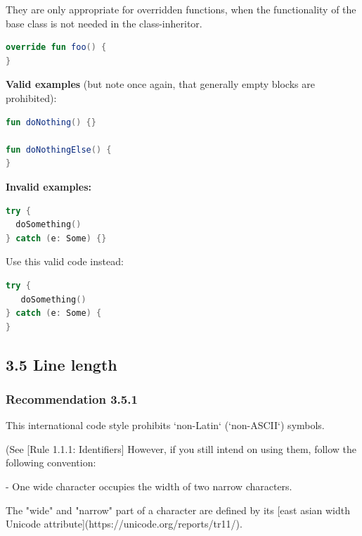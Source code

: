 They are only appropriate for overridden functions, when the functionality of the base class is not needed in the class-inheritor.



\begin{lstlisting}[language=Kotlin]
override fun foo() {    
}
\end{lstlisting}


\textbf{Valid examples} (but note once again, that generally empty blocks are prohibited):



\begin{lstlisting}[language=Kotlin]
fun doNothing() {} 

fun doNothingElse() {
}
\end{lstlisting}


\textbf{Invalid examples:}

\begin{lstlisting}[language=Kotlin]
try {
  doSomething()
} catch (e: Some) {}
\end{lstlisting}


Use this valid code instead:

\begin{lstlisting}[language=Kotlin]
try {
   doSomething()
} catch (e: Some) {
}
\end{lstlisting}


\subsection*{\textbf{3.5 Line length}}

\subsubsection*{\textbf{Recommendation 3.5.1}}
\leavevmode\newline



This international code style prohibits `non-Latin` (`non-ASCII`) symbols.

(See [Rule 1.1.1: Identifiers] However, if you still intend on using them, follow the following convention:



- One wide character occupies the width of two narrow characters.

The "wide" and "narrow" part of a character are defined by its [east asian width Unicode attribute](https://unicode.org/reports/tr11/).

